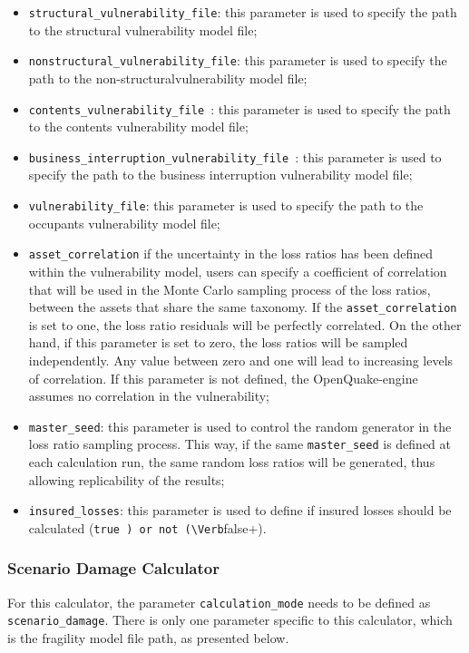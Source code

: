 \begin{itemize}
\item  \Verb+structural_vulnerability_file+: this parameter is used to specify the path to the structural \gls{vulnerability model} file;
\item  \Verb+nonstructural_vulnerability_file+: this parameter is used to specify the path to the non-structural\gls{vulnerability model} file;
\item  \Verb+contents_vulnerability_file +: this parameter is used to specify the path to the contents \gls{vulnerability model} file;
\item  \Verb+business_interruption_vulnerability_file +: this parameter is used to specify the path to the business interruption \gls{vulnerability model} file;
\item  \Verb+vulnerability_file+: this parameter is used to specify the path to the occupants \gls{vulnerability model} file;
\item \texttt{asset\_cor\-re\-la\-tion} if the uncertainty in the loss ratios has been defined within the \gls{vulnerability model}, users can specify a coefficient of correlation that will be used in the Monte Carlo sampling process of the loss ratios, between the assets that share the same \gls{taxonomy}. If the \texttt{asset\_cor\-re\-la\-tion} is set to one, the loss ratio residuals will be perfectly correlated. On the other hand, if this parameter is set to zero, the loss ratios will be sampled independently. Any value between zero and one will lead to increasing levels of correlation. If this parameter is not defined, the OpenQuake-engine assumes no correlation in the vulnerability;
\item  \Verb+master_seed+: this parameter is used to control the random generator in the loss ratio sampling process. This way, if the same \Verb+master_seed+ is defined at each calculation run, the same random loss ratios will be generated, thus allowing replicability of the results;
\item  \Verb+insured_losses+: this parameter is used to define if insured losses should be calculated (\Verb+true ) or not (\Verb+false+).
\end{itemize}

\subsubsection{Scenario Damage Calculator}
For this calculator, the parameter \Verb+calculation_mode+ needs to be defined as \Verb+scenario_damage+. There is only one parameter specific to this calculator, which is the \gls{fragility model} file path, as presented below.

